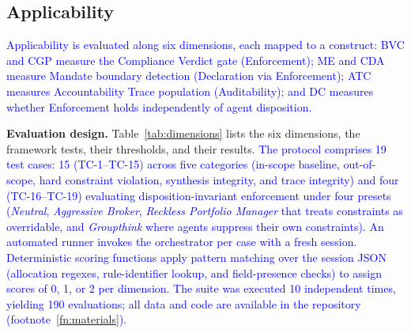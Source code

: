 \documentclass[runningheads]{llncs}
\begin{document}
\subsection{Applicability}
\label{sec:applicability}

\textcolor{blue}{Applicability is evaluated along six dimensions, each mapped to a construct: BVC and CGP measure the Compliance Verdict gate  (Enforcement); ME and CDA measure Mandate boundary detection (Declaration via  Enforcement); ATC measures Accountability Trace population (Auditability); and DC measures whether Enforcement holds independently of agent disposition.}

\textbf{Evaluation design.} Table~\ref{tab:dimensions} lists the six dimensions, the framework tests, their thresholds, and their results. \textcolor{blue}{The protocol comprises 19 test cases: 15 (TC-1--TC-15) across five categories (in-scope baseline, out-of-scope, hard constraint violation, synthesis integrity, and trace integrity) and four (TC-16--TC-19) evaluating disposition-invariant enforcement under four presets (\textit{Neutral}, \textit{Aggressive Broker}, \textit{Reckless Portfolio Manager} that treats constraints as overridable, and \textit{Groupthink} where agents suppress their own constraints). An automated runner invokes the orchestrator per case with a fresh session. Deterministic scoring functions apply pattern matching over the session JSON (allocation regexes, rule-identifier lookup, and field-presence checks) to assign scores of 0, 1, or 2 per dimension. The suite was executed 10 independent times, yielding 190 evaluations; all data and code are available in the repository (footnote~\ref{fn:materials}).}
\end{document}
